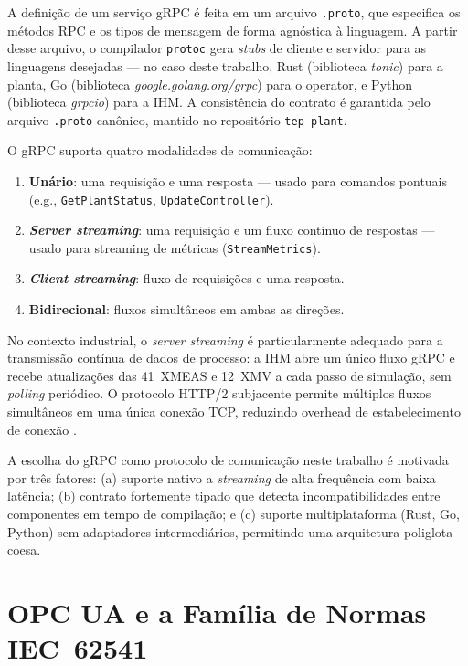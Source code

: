 A definição de um serviço gRPC é feita em um arquivo \texttt{.proto}, que especifica os métodos RPC e os tipos de mensagem de forma agnóstica à linguagem. A partir desse arquivo, o compilador \texttt{protoc} gera \textit{stubs} de cliente e servidor para as linguagens desejadas — no caso deste trabalho, Rust (biblioteca \textit{tonic}) para a planta, Go (biblioteca \textit{google.golang.org/grpc}) para o operator, e Python (biblioteca \textit{grpcio}) para a IHM. A consistência do contrato é garantida pelo arquivo \texttt{.proto} canônico, mantido no repositório \texttt{tep-plant}.

O gRPC suporta quatro modalidades de comunicação:
\begin{enumerate}
  \item \textbf{Unário}: uma requisição e uma resposta — usado para comandos pontuais (e.g., \texttt{GetPlantStatus}, \texttt{UpdateController}).
  \item \textbf{\textit{Server streaming}}: uma requisição e um fluxo contínuo de respostas — usado para streaming de métricas (\texttt{StreamMetrics}).
  \item \textbf{\textit{Client streaming}}: fluxo de requisições e uma resposta.
  \item \textbf{Bidirecional}: fluxos simultâneos em ambas as direções.
\end{enumerate}

No contexto industrial, o \textit{server streaming} é particularmente adequado para a transmissão contínua de dados de processo: a IHM abre um único fluxo gRPC e recebe atualizações das 41~XMEAS e 12~XMV a cada passo de simulação, sem \textit{polling} periódico. O protocolo HTTP/2 subjacente permite múltiplos fluxos simultâneos em uma única conexão TCP, reduzindo overhead de estabelecimento de conexão \cite{GRPC2024}.

A escolha do gRPC como protocolo de comunicação neste trabalho é motivada por três fatores: (a) suporte nativo a \textit{streaming} de alta frequência com baixa latência; (b) contrato fortemente tipado que detecta incompatibilidades entre componentes em tempo de compilação; e (c) suporte multiplataforma (Rust, Go, Python) sem adaptadores intermediários, permitindo uma arquitetura poliglota coesa.

\section{OPC UA e a Família de Normas IEC~62541}
\label{sec:opcua}

